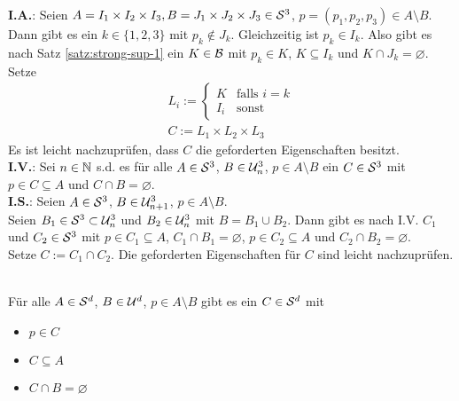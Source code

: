 \begin{bew}
    \textbf{I.A.}: Seien $A = I_1 \times I_2 \times I_3, B = J_1 \times J_2 \times J_3 \in \mathcal{S}^3$, $p = (p_1,p_2,p_3) \in A \setminus B$.\\
    Dann gibt es ein $k \in \{1,2,3\}$ mit $p_k \notin J_k$. 
    Gleichzeitig ist $p_k \in I_k$. 
    Also gibt es nach Satz \ref{satz:strong-sup-1} ein $K \in \mathcal{B}$ mit $p_k \in K$, $K \subseteq I_k$ und $K \cap J_k = \varnothing$.
    Setze
    \begin{align*}
        L_i :=
        \begin{cases}
            K & \text{falls $i=k$}\\
            I_i & \text{sonst}
        \end{cases}\\
        C := L_1 \times L_2 \times L_3
    \end{align*}
    Es ist leicht nachzuprüfen, dass $C$ die geforderten Eigenschaften besitzt.\\
    \textbf{I.V.}: Sei $n \in \mathbb{N}$ s.d. es für alle $A \in \mathcal{S}^3$, $B \in \mathcal{U}_n^3$, $p \in A \setminus B$ ein $C \in \mathcal{S}^3$ mit $p \in C \subseteq A$ und $C \cap B = \varnothing$.\\
    \textbf{I.S.}: Seien $A \in \mathcal{S}^3$, $B \in \mathcal{U}_{n+1}^3$, $p \in A \setminus B$.\\
    Seien $B_1 \in \mathcal{S}^3 \subset \mathcal{U}_n^3$ und $B_2 \in \mathcal{U}_n^3$ mit $B = B_1 \cup B_2$.
    Dann gibt es nach I.V. $C_1$ und $C_2 \in \mathcal{S}^3$ mit $p \in C_1 \subseteq A$, $C_1 \cap B_1 = \varnothing$, $p \in C_2 \subseteq A$ und $C_2 \cap B_2 = \varnothing$.\\
    Setze $C := C_1 \cap C_2$. Die geforderten Eigenschaften für $C$ sind leicht nachzuprüfen.
\end{bew}


\begin{satz}\ \\
    Für alle $A \in \mathcal{S}^d$, $B \in \mathcal{U}^d$, $p \in A \setminus B$ gibt es ein $C \in \mathcal{S}^d$ mit
    \begin{itemize}
        \item $p \in C$
        \item $C \subseteq A$
        \item $C \cap B = \varnothing$
    \end{itemize}
\end{satz}

